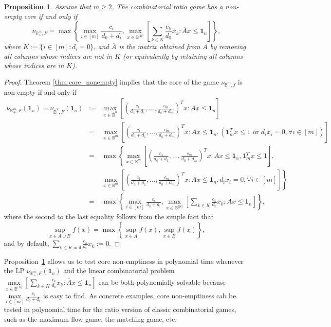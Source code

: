 \documentclass[11pt]{article}\usepackage[]{graphicx}\usepackage[]{xcolor}
\newtheorem{prop}{Proposition}
\begin{document}
\begin{prop}\label{prop:ratio-game} Assume that $m\ge 2$, The combinatorial ratio game has a non-empty core if and only if 
\[
\nu_{\mathbb{R}^m_{+},F}=\max\left\{\max\limits_{i\in [m]} \frac{c_i}{d_0+d_i}, \max\limits_{x\in \mathbb{B}^{|K|}} \left[\sum_{k\in K}\frac{c_k}{d_0}x_k: \overline{A}x\le \mathbf{1}_n\right]\right\},
\]
where $K:=\{i\in[m]: d_i=0\}$, and $\overline{A}$ is the matrix obtained from $A$ by removing all columns whose indices are not in $K$ (or equivalently by retaining all columns whose indices are in $K$).
\end{prop}
\begin{proof}
Theorem \ref{thm:core_nonempty} implies that the core of the game $\nu_{\mathbb{B}^m,f}$ is non-empty if and only if 
\begin{eqnarray*}
\nu_{\mathbb{R}^m_{+},F}\left(\mathbf{1}_n\right)=\nu_{\overline{\mathbb{B}}^n, F}\left(\mathbf{1}_n\right)&:=&\max\limits_{x\in \overline{\mathbb{B}}^n} \left[\left(\frac{c_1}{d_0+d_1},\ldots,\frac{c_m}{d_0+d_m}\right)^T x: Ax\le \mathbf{1}_n\right]\\
&=&\max\limits_{x\in \mathbb{B}^m} \left[\left(\frac{c_1}{d_0+d_1},\ldots,\frac{c_m}{d_0+d_m}\right)^T x: Ax\le \mathbf{1}_n, \left(\mathbf{1}_m^Tx\le 1 \text{ or } d_ix_i=0, \forall i\in [m]\right)\right]\\
&=&\max\left\{\max\limits_{x\in \mathbb{B}^m} \left[\left(\frac{c_1}{d_0+d_1},\ldots,\frac{c_m}{d_0+d_m}\right)^T x: Ax\le \mathbf{1}_n, \mathbf{1}_m^Tx\le 1\right]\right.,\\
&&\left.\max\limits_{x\in \mathbb{B}^m} \left[\left(\frac{c_1}{d_0+d_1},\ldots,\frac{c_m}{d_0+d_m}\right)^T x: Ax\le \mathbf{1}_n, d_ix_i=0, \forall i\in [m]\right]\right\}\\
&=&\max\left\{\max\limits_{i\in [m]} \frac{c_i}{d_0+d_i}, \max\limits_{x\in \mathbb{B}^{|K|}} \left[\sum_{k\in K}\frac{c_k}{d_0}x_k: \overline{A}x\le \mathbf{1}_n\right]\right\},
\end{eqnarray*}
where the second to the last equality follows from the simple fact that 
\[
\sup_{x\in A\cup B} f(x)=\max\left\{\sup_{x\in A} f(x), \sup_{x\in B} f(x)\right\},
\]
and by default, $\sum_{k\in K=\emptyset}\frac{c_k}{d_0}x_k:=0$.
\end{proof}

Proposition~\ref{prop:ratio-game} allows us to test core non-emptiness in polynomial time whenever the LP $\nu_{\mathbb{R}^m_{+},F}\left(\mathbf{1}_n\right)$ and the linear combinatorial problem $\max\limits_{x\in \mathbb{B}^{|K|}} \left[\sum_{k\in K}\frac{c_k}{d_0}x_k: \overline{A}x\le \mathbf{1}_n\right]$ can be both polynomially solvable because $\max\limits_{i\in [m]} \frac{c_i}{d_0+d_i}$ is easy to find. As concrete examples, core non-emptiness cab be tested in polynomial time for the ratio version of classic combinatorial games, such as the maximum flow game, the matching game, etc. 
\end{document}
